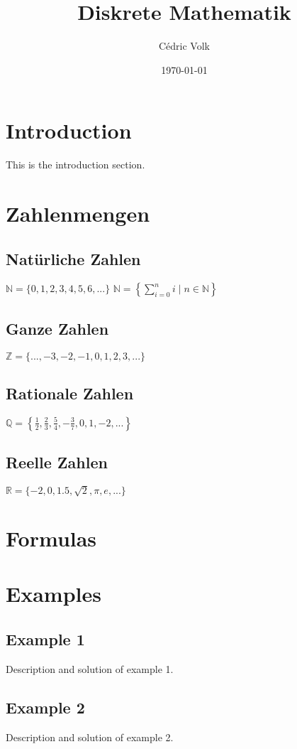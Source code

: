 \documentclass[a4paper,10pt]{article}
\title{Diskrete Mathematik}
\author{Cédric Volk}
\date{\today}
\begin{document}
\maketitle

\tableofcontents

\section{Introduction}
This is the introduction section.

\section{Zahlenmengen}
\subsection{Natürliche Zahlen}
\(\mathbb{N} = \{0,1,2,3,4,5,6,...\}\)
\(
\mathbb{N} = \left\{ \sum_{i=0}^{n} i \mid n \in \mathbb{N} \right\}
\)
\subsection{Ganze Zahlen}
\(\mathbb{Z} = \{...,-3,-2,-1,0,1,2,3,...\}\)
\subsection{Rationale Zahlen}
\(\mathbb{Q} = \left\{ \frac{1}{2}, \frac{2}{3}, \frac{5}{4}, -\frac{3}{7}, 0, 1, -2, ... \right\}\)
\subsection{Reelle Zahlen}
\(\mathbb{R} = \{ -2, 0, 1.5, \sqrt{2}, \pi, e, ... \}\)

\section{Formulas}

\section{Examples}
\subsection{Example 1}
Description and solution of example 1.

\subsection{Example 2}
Description and solution of example 2.
\end{document}
